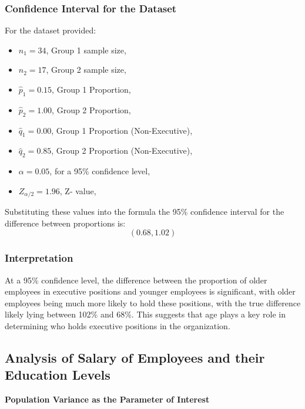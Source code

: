 \documentclass[12pt,a4paper]{article}
\begin{document}
\subsubsection*{Confidence Interval for the Dataset}

For the dataset provided:
\begin{itemize}
    \item \(n_1 = 34\), Group 1 sample size,
    \item \(n_2 = 17\), Group 2 sample size,
    \item \( {\hat{p}_1}= 0.15\), Group 1 Proportion,
     \item \( {\hat{p}_2}= 1.00\), Group 2 Proportion,
        \item \( {\hat{q}_1}= 0.00\), Group 1 Proportion (Non-Executive),
     \item \( {\hat{q}_2}= 0.85\), Group 2 Proportion (Non-Executive),
    \item \(\alpha = 0.05\), for a 95\% confidence level,
    \item \( Z_{\alpha/2} = 1.96\), Z- value,

\end{itemize}

Substituting these values into the formula the 95\% confidence interval for the difference between proportions is:
\[
\left( 0.68, 1.02 \right)
\]

\subsubsection*{Interpretation}

At a 95\% confidence level, the difference between the proportion of older employees in executive positions and younger employees is significant, with older employees being much more likely to hold these positions, with the true difference likely lying between 102\% and 68\%. This suggests that age plays a key role in determining who holds executive positions in the organization.
\newpage


\subsection{Analysis of Salary of Employees and their Education Levels}

\vspace{1em}

\textbf{Population Variance as the Parameter of Interest}

\vspace{1em}
\end{document}
